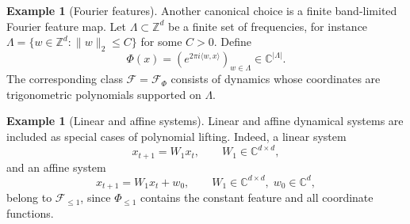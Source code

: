 \documentclass[11pt]{article}
\theoremstyle{plain}
\theoremstyle{definition}
\newtheorem{example}[theorem]{Example}
\theoremstyle{remark}
\begin{document}
\begin{example}[Fourier features]
Another canonical choice is a finite band-limited Fourier feature map. Let
$
\Lambda \subset \mathbb Z^d
$
be a finite set of frequencies, for instance
$
\Lambda=\{w\in\mathbb Z^d:\|w\|_2\le C\}
$ for some $C>0$.
Define
\[
\Phi(x)
=
\left(
e^{2\pi i \langle w,x\rangle}
\right)_{w\in\Lambda}
\in \mathbb C^{|\Lambda|}.
\]
The corresponding class \(\mathcal F = \mathcal F_{\Phi}\) consists of dynamics whose coordinates are trigonometric polynomials supported on \(\Lambda\).
\end{example}

\begin{example}[Linear and affine systems]
Linear and affine dynamical systems are included as special cases of polynomial lifting. Indeed, a linear system
\[
x_{t+1}=W_1x_t,
\qquad W_1\in\mathbb C^{d\times d},
\]
and an affine system
\[
x_{t+1}=W_1x_t+w_0,
\qquad W_1\in\mathbb C^{d\times d},\; w_0\in\mathbb C^d,
\]
belong to \(\mathcal F_{\le 1}\), since \(\Phi_{\le 1}\) contains the constant feature and all coordinate functions.
\end{example}

 






\end{document}
